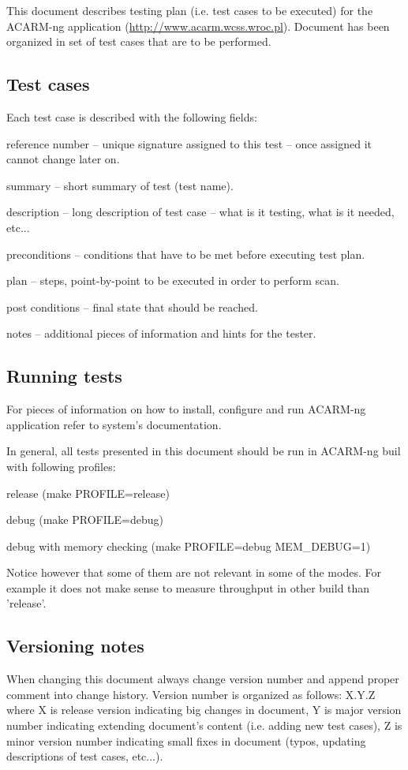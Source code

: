 This document describes testing plan (i.e. test cases to be executed) for the ACARM-ng application
(\url{http://www.acarm.wcss.wroc.pl}). Document has been organized in set of test cases that are to be performed.



\subsection{Test cases}
Each test case is described with the following fields:
\begin{itemize*}
  \item reference number -- unique signature assigned to this test -- once assigned it cannot change later on.
  \item summary -- short summary of test (test name).
  \item description -- long description of test case -- what is it testing, what is it needed, etc...
  \item preconditions -- conditions that have to be met before executing test plan.
  \item plan -- steps, point-by-point to be executed in order to perform scan.
  \item post conditions -- final state that should be reached.
  \item notes -- additional pieces of information and hints for the tester.
\end{itemize*}



\subsection{Running tests}
For pieces of information on how to install, configure and run ACARM-ng application refer to system's documentation.

In general, all tests presented in this document should be run in ACARM-ng buil with following profiles:
\begin{itemize*}
\item release (make PROFILE=release)
\item debug (make PROFILE=debug)
\item debug with memory checking (make PROFILE=debug MEM\_DEBUG=1)
\end{itemize*}
Notice however that some of them are not relevant in some of the modes. For example it does not make sense
to measure throughput in other build than 'release'.



\subsection{Versioning notes}
When changing this document always change version number and append proper comment into change history.
Version number is organized as follows: X.Y.Z where X is release version indicating big changes in document,
Y is major version number indicating extending document's content (i.e. adding new test cases), Z is minor
version number indicating small fixes in document (typos, updating descriptions of test cases, etc...).
